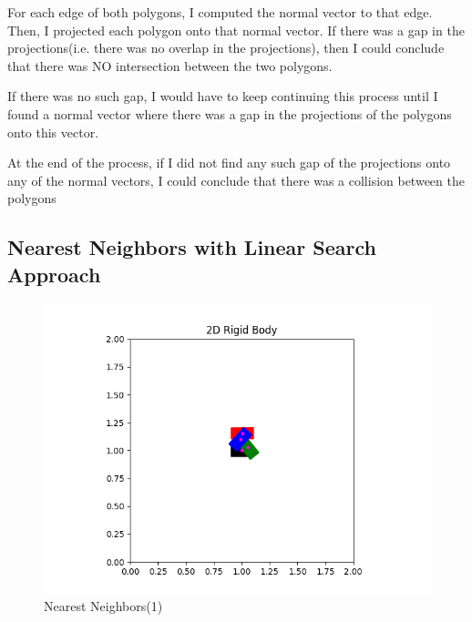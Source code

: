 \documentclass{article}
\begin{document}
For each edge of both polygons, I computed the normal vector to that edge. Then, I projected each polygon onto that normal vector. If there was a gap in the projections(i.e. there was no overlap in the projections), then I could conclude that there was NO intersection between the two polygons. 

If there was no such gap, I would have to keep continuing this process until I found a normal vector where there was a gap in the projections of the polygons onto this vector. 

At the end of the process, if I did not find any such gap of the projections onto any of the normal vectors, I could conclude that there was a collision between the polygons 

\newpage 
\subsection{Nearest Neighbors with Linear Search Approach}
\begin{figure}[h!]
	\includegraphics[width= 0.9 \linewidth]{P2_NearestNeighbor(1).png}
	\centering
	\caption{Nearest Neighbors(1)}
	\label{P2_NearestNeighbor(1).png}
\end{figure}
\end{document}

